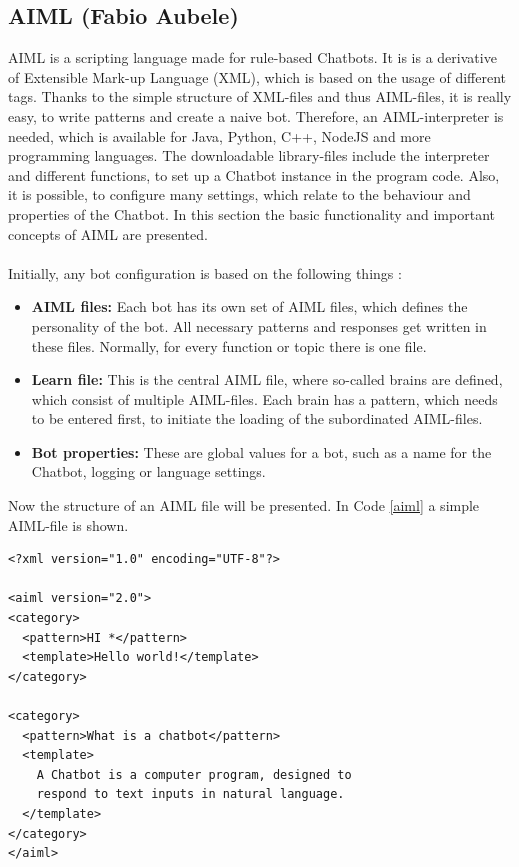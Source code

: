 \documentclass[10pt,final,journal,a4paper,oneside,twocolumn]{IEEEtran}
\begin{document}
\subsection{AIML (Fabio Aubele)}
AIML is a scripting language made for rule-based Chatbots. It is is a derivative of Extensible Mark-up Language (XML), which is based on the usage of different tags. Thanks to the simple structure of XML-files and thus AIML-files, it is really easy, to write patterns and create a naive bot. Therefore, an AIML-interpreter is needed, which is available for Java, Python, C++, NodeJS and more programming languages. The downloadable library-files include the interpreter and different functions, to set up a Chatbot instance in the program code. Also, it is possible, to configure many settings, which relate to the behaviour and properties of the Chatbot. In this section the basic functionality and important concepts of AIML are presented.\\
\\
Initially, any bot configuration is based on the following things \cite{b20}:
\begin{itemize}
	\item \textbf{AIML files:} Each bot has its own set of AIML files, which defines the personality of the bot. All necessary patterns and responses get written in these files. Normally, for every function or topic there is one file.
	\item \textbf{Learn file:} This is the central AIML file, where so-called brains are defined, which consist of multiple AIML-files. Each brain has a pattern, which needs to be entered first, to initiate the loading of the subordinated AIML-files.
	\item \textbf{Bot properties:} These are global values for a bot, such as a name for the Chatbot, logging or language settings.
\end{itemize}
Now the structure of an AIML file will be presented. In Code \ref{aiml} a simple AIML-file is shown.
\begin{lstlisting}[caption={Example of an AIML file (based on \cite{b20}).},label=aiml,lineskip=1pt]
<?xml version="1.0" encoding="UTF-8"?>

<aiml version="2.0">
<category>
  <pattern>HI *</pattern>
  <template>Hello world!</template>
</category>

<category>
  <pattern>What is a chatbot</pattern>
  <template>
    A Chatbot is a computer program, designed to
    respond to text inputs in natural language.
  </template>
</category>
</aiml>
\end{lstlisting}
\end{document}
